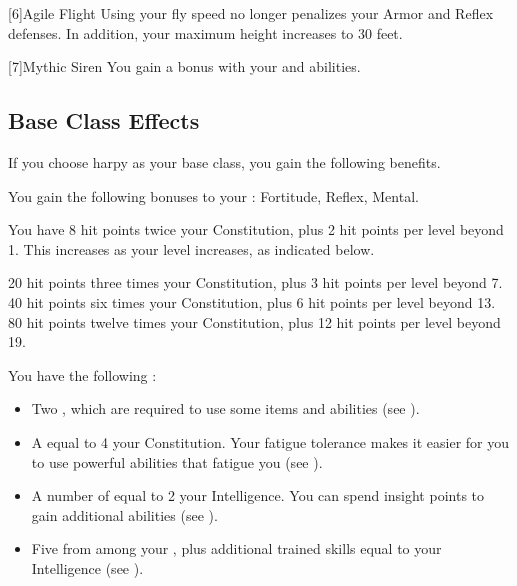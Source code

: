         [6]{Agile Flight} Using your fly speed no longer penalizes your Armor and Reflex defenses.
        In addition, your maximum height increases to 30 feet.

        [7]{Mythic Siren} You gain a   bonus with your  and  abilities.

    \subsection{Base Class Effects}
        If you choose harpy as your base class, you gain the following benefits.

        You gain the following bonuses to your :  Fortitude,  Reflex,  Mental.

            You have 8 hit points \add twice your Constitution, plus 2 hit points per level beyond 1.
            This increases as your level increases, as indicated below.
            \begin{itemize}
                 20 hit points \add three times your Constitution, plus 3 hit points per level beyond 7.
                 40 hit points \add six times your Constitution, plus 6 hit points per level beyond 13.
                 80 hit points \add twelve times your Constitution, plus 12 hit points per level beyond 19.
            \end{itemize}

         You have the following :
        \begin{itemize}
            \item Two , which are required to use some items and abilities (see ).
            \item A  equal to 4 \add your Constitution.
                Your fatigue tolerance makes it easier for you to use powerful abilities that fatigue you (see ).
            \item A number of  equal to 2 \add your Intelligence.
                You can spend insight points to gain additional abilities (see ).
            \item Five  from among your , plus additional trained skills equal to your Intelligence (see ).
        \end{itemize}

